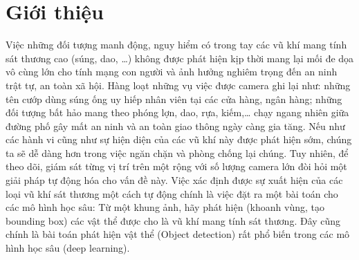 \documentclass[a4paper]{article}
\begin{document}
\tableofcontents
\onecolumn

\section{\textbf{Giới thiệu}}
Việc những đối tượng manh động, nguy hiểm có trong tay các vũ khí mang tính sát thương cao (súng, dao, …) không được phát hiện kịp thời mang lại mối đe dọa vô cùng lớn cho tính mạng con người và ảnh hưởng nghiêm trọng đến an ninh trật tự, an toàn xã hội. Hàng loạt những vụ việc được camera ghi lại như: những tên cướp dùng súng ống uy hiếp nhân viên tại các cửa hàng, ngân hàng; những đối tượng bất hảo mang theo phóng lợn, dao, rựa, kiếm,…  chạy ngang nhiên giữa đường phố gây mất an ninh và an toàn giao thông ngày càng gia tăng. Nếu như các hành vi cũng như sự hiện diện của các vũ khí này được phát hiện sớm, chúng ta sẽ dễ dàng hơn trong việc ngăn chặn và phòng chống lại chúng.  Tuy nhiên, để theo dõi, giám sát từng vị trí trên một rộng với số lượng camera lớn đòi hỏi một giải pháp tự động hóa cho vấn đề này. Việc xác định được sự xuất hiện của các loại vũ khí sát thương một cách tự động chính là việc đặt ra một bài toán cho các mô hình học sâu: Từ một khung ảnh, hãy phát hiện (khoanh vùng, tạo bounding box) các vật thể được cho là vũ khí mang tính sát thương. Đây cũng chính là bài toán phát hiện vật thể (Object detection) rất phổ biến trong các mô hình học sâu (deep learning). \\
\end{document}
